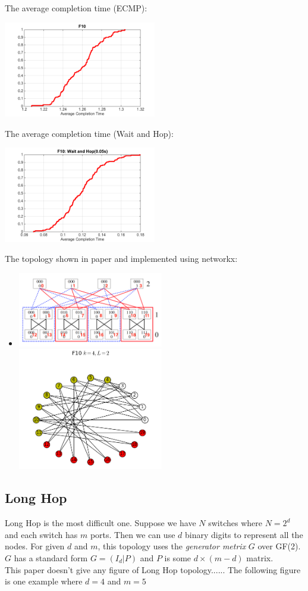 \documentclass[11pt]{article}
\begin{document}
The average completion time (ECMP):\\
\centerline{\includegraphics[width=0.5\textwidth]{figure/picture/F10.png}}
The average completion time (Wait and Hop):\\
\centerline{\includegraphics[width=0.5\textwidth]{figure/picture/F10_wait_and_hop.png}}
The topology shown in paper and implemented using networkx: \\
\begin{itemize}
	\item \centerline{}
	\includegraphics[width=0.5\textwidth]{figure/draw/F10_original}
	\includegraphics[width=0.5\textwidth]{figure/draw/F10.png}
\end{itemize}

\subsection{Long Hop}
Long Hop is the most difficult one. Suppose we have $N$ switches where $N = 2^d$  and each switch has $m$ ports. Then we can use $d$ binary digits to represent all the nodes. For given $d$ and $m$, this topology uses the \emph{generator metrix} $G$ over GF(2). $G$ has a standard form $G = (I_d | P)$ and $P$ is some $d \times (m-d)$ matrix.\vspace{2ex}\\
This paper doesn't give any figure of Long Hop topology...... The following figure is one example where $d=4$ and $m=5$
\end{document}
